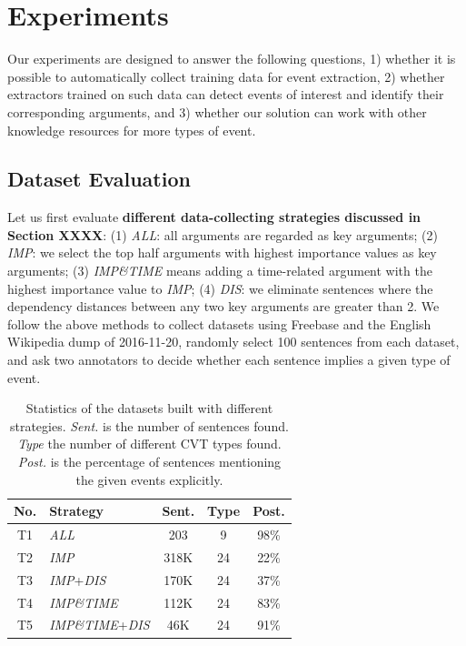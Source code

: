 \section{Experiments}
Our experiments are designed to answer the following questions, 
1) whether it is possible to automatically collect training data for event extraction, 
2) whether  extractors trained on such data can detect events of interest and identify
their corresponding arguments,
and 3) whether our solution can work with other knowledge resources for more types of event. 

 \subsection{Dataset Evaluation}\label{sec:evalhypo}
Let us first evaluate \textbf{different data-collecting strategies discussed in Section XXXX}:
(1) \emph{ALL}: all arguments are regarded as key arguments; (2) \emph{IMP}: we select the top half arguments with highest importance values as key arguments; (3) \emph{IMP\&TIME} means adding a time-related argument with the highest importance value to %
\emph{IMP}; (4) \emph{DIS}: we eliminate sentences where the dependency distances between any two key arguments are greater than 2. 
We follow the above methods to collect datasets using Freebase and the English Wikipedia dump of 2016-11-20, 
randomly select 100 sentences from each dataset, and ask two annotators to decide whether each sentence implies a given type of event.




\begin{table}[h]
\small
\centering
\begin{tabular}{|c|l|c|c|c|} \hline
	No. & Strategy & Sent. & Type & Post. \\ \hline
	T1 & \emph{ALL} & 203 & 9 & 98\% \\ \hline
	T2 & \emph{IMP} & 318K & 24 & 22\% \\ \hline
	T3 & \emph{IMP}+\emph{DIS} & 170K & 24 & 37\% \\ \hline
	T4 & \emph{IMP\&TIME} & 112K & 24 & 83\% \\ \hline
	T5 & \emph{IMP\&TIME}+\emph{DIS} & 46K & 24 & 91\% \\ \hline
\end{tabular}
\caption{Statistics of the datasets built with different strategies. 
\textit{Sent.} is the number of sentences found. \textit{Type} the number of different CVT types found.  \textit{Post.} is the percentage of sentences mentioning the given events explicitly.\label{tab:3}}
\end{table}

